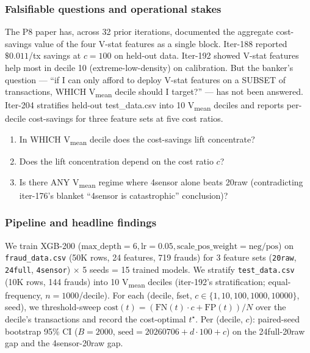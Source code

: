 
\subsubsection{Falsifiable questions and operational stakes}\label{sec:p8-iter204-questions}
The P8 paper has, across 32 prior iterations, documented the aggregate
cost-savings value of the four V-stat features as a single block.
Iter-188 reported $\$0.011$/tx savings at $c{=}100$ on held-out data.
Iter-192 showed V-stat features help most in decile 10 (extreme-low-density)
on calibration. But the banker's question --- ``if I can only afford to
deploy V-stat features on a SUBSET of transactions, WHICH V\textsubscript{mean}
decile should I target?'' --- has not been answered. Iter-204 stratifies
held-out test\_data.csv into 10 V\textsubscript{mean} deciles and reports
per-decile cost-savings for three feature sets at five cost ratios.

\begin{enumerate}
\item In WHICH V\textsubscript{mean} decile does the cost-savings lift
  concentrate?
\item Does the lift concentration depend on the cost ratio $c$?
\item Is there ANY V\textsubscript{mean} regime where 4sensor alone beats
  20raw (contradicting iter-176's blanket ``4sensor is catastrophic''
  conclusion)?
\end{enumerate}

\subsubsection{Pipeline and headline findings}\label{sec:p8-iter204-pipeline}
We train XGB-200 ($\mathrm{max\_depth}{=}6, \mathrm{lr}{=}0.05,
\mathrm{scale\_pos\_weight}{=}\mathrm{neg}/\mathrm{pos}$) on
\texttt{fraud\_data.csv} (50K rows, 24 features, 719 frauds) for 3 feature
sets (\texttt{20raw}, \texttt{24full}, \texttt{4sensor}) $\times$ 5 seeds
= 15 trained models. We stratify \texttt{test\_data.csv} (10K rows,
144 frauds) into 10 V\textsubscript{mean} deciles (iter-192's
stratification; equal-frequency, $n{=}1000$/decile). For each
(decile, fset, $c \in \{1, 10, 100, 1000, 10000\}$, seed), we
threshold-sweep $\mathrm{cost}(t) = (\mathrm{FN}(t) \cdot c + \mathrm{FP}(t))/N$
over the decile's transactions and record the cost-optimal $t^{\star}$.
Per (decile, $c$): paired-seed bootstrap 95\% CI ($B{=}2000$,
$\mathrm{seed}{=}20260706{+}d{\cdot}100{+}c$) on the
24full-20raw gap and the 4sensor-20raw gap.

